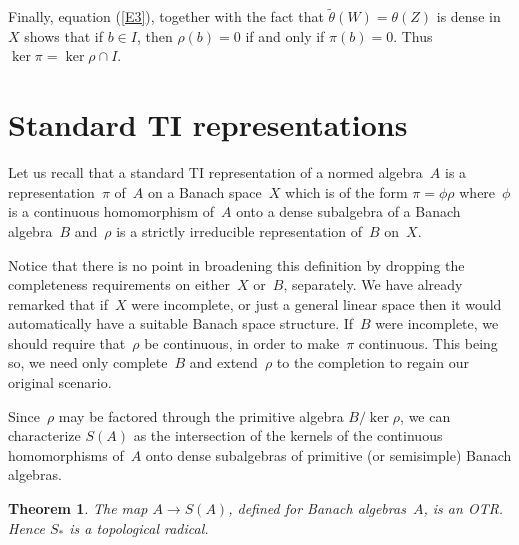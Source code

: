 \documentclass[11pt]{article}
\newtheorem{thm}{Theorem}[section]
\newenvironment{PoL}{{\it Proof of Lemma. }}{}
\begin{document}
\begin{PoL}
Finally, equation (\ref{E3}), together with the fact that $\tilde\theta(W) =
\theta(Z)$ is dense in~$X$ shows that if $b \in I$, then $\rho(b) = 0$ if and
only if $\pi(b) = 0$.  Thus $\ker\pi = \ker\rho \cap I$.
\end{PoL}
\section{Standard TI representations}\label{S7}

Let us recall that a standard TI representation of a normed algebra~$A$
is a representation~$\pi$ of~$A$ on a Banach space~$X$ which is of the
form $\pi = \phi\rho$ where~$\phi$ is a continuous homomorphism of~$A$ onto
a dense subalgebra of a Banach algebra~$B$ and~$\rho$ is a strictly irreducible
representation of~$B$ on~$X$.

Notice that there is no point in broadening this definition by dropping the
completeness requirements on either~$X$ or~$B$, separately.   We have already
remarked that if~$X$ were incomplete, or just a general linear space then it
would automatically have a suitable Banach space structure.   If~$B$ were
incomplete, we should require that~$\rho$ be continuous, in order to
make~$\pi$ continuous.  This being so, we need only complete~$B$ and
extend~$\rho$ to the completion to regain our original scenario.

Since~$\rho$ may be factored through the primitive algebra $B/\ker\rho$, we can
characterize $S(A)$ as the intersection of the kernels of the continuous
homomorphisms of~$A$ onto dense subalgebras of primitive (or semisimple) Banach
algebras.

\begin{thm} \label{T8}
The map $A \to S(A)$, defined for Banach algebras~$A$, is an OTR.
Hence $S_*$ is a topological radical.
\end{thm}
\end{document}
